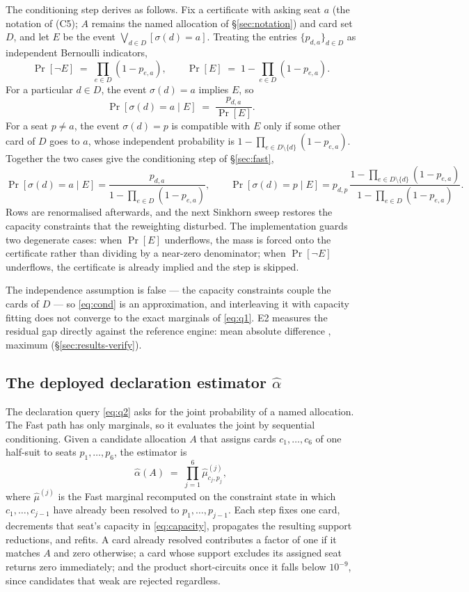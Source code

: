 The conditioning step derives as follows. Fix a certificate with asking seat $a$
(the notation of (C5); $A$ remains the named allocation of \S\ref{sec:notation})
and card set $D$, and let $E$ be the event $\bigvee_{d\in D}[\sigma(d)=a]$.
Treating the entries $\{p_{d,a}\}_{d \in D}$ as independent Bernoulli indicators,
\[
  \Pr[\neg E] \;=\; \prod_{e \in D} (1 - p_{e,a}),
  \qquad
  \Pr[E] \;=\; 1 - \prod_{e \in D} (1 - p_{e,a}) .
\]
For a particular $d \in D$, the event $\sigma(d) = a$ implies $E$, so
\[
  \Pr[\sigma(d) = a \mid E] \;=\; \frac{p_{d,a}}{\Pr[E]} .
\]
For a seat $p \ne a$, the event $\sigma(d) = p$ is compatible with $E$ only if
some other card of $D$ goes to $a$, whose independent probability is
$1 - \prod_{e \in D\setminus\{d\}}(1 - p_{e,a})$. Together the two cases give the
conditioning step of \S\ref{sec:fast},
\begin{equation}
  \Pr[\sigma(d) = a \mid E] = \frac{p_{d,a}}{1 - \prod_{e \in D}(1 - p_{e,a})},
  \qquad
  \Pr[\sigma(d) = p \mid E] = p_{d,p}\,
    \frac{1 - \prod_{e \in D \setminus \{d\}}(1 - p_{e,a})}{1 - \prod_{e \in D}(1 - p_{e,a})}.
  \label{eq:cond}
\end{equation}
Rows are renormalised afterwards, and
the next Sinkhorn sweep restores the capacity constraints that the reweighting
disturbed. The implementation guards two degenerate cases: when $\Pr[E]$
underflows, the mass is forced onto the certificate rather than dividing by a
near-zero denominator; when $\Pr[\neg E]$ underflows, the certificate is already
implied and the step is skipped.

The independence assumption is false --- the capacity constraints couple the
cards of $D$ --- so \eqref{eq:cond} is an approximation, and interleaving it with
capacity fitting does not converge to the exact marginals of
\eqref{eq:q1}. E2 measures the residual gap directly against the reference
engine: mean absolute difference \numSinkhornMean{}, maximum \numSinkhornMax{}
(\S\ref{sec:results-verify}).

\subsection{The deployed declaration estimator $\hat\alpha$}
\label{app:alpha}

The declaration query \eqref{eq:q2} asks for the joint probability of a named
allocation. The Fast path has only marginals, so it evaluates the joint by
sequential conditioning. Given a candidate allocation $A$ that assigns cards
$c_1,\dots,c_6$ of one half-suit to seats $p_1,\dots,p_6$, the estimator is
\[
  \hat\alpha(A) \;=\; \prod_{j=1}^{6} \hat\mu^{(j)}_{c_j, p_j},
\]
where $\hat\mu^{(j)}$ is the Fast marginal recomputed on the constraint state in
which $c_1,\dots,c_{j-1}$ have already been resolved to $p_1,\dots,p_{j-1}$. Each
step fixes one card, decrements that seat's capacity in \eqref{eq:capacity},
propagates the resulting support reductions, and refits. A card already resolved
contributes a factor of one if it matches $A$ and zero otherwise; a card whose
support excludes its assigned seat returns zero immediately; and the product
short-circuits once it falls below $10^{-9}$, since candidates that weak are
rejected regardless.

